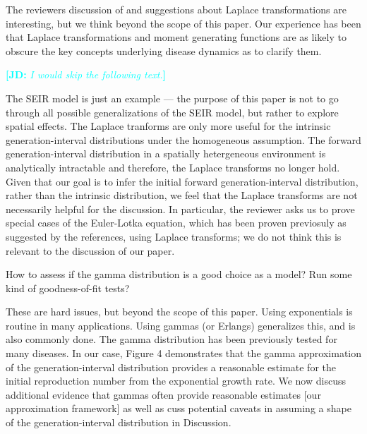 \documentclass[12pt]{article}
\newcommand{\revtext}{\textsf}
\newcommand{\comment}[3]{\textcolor{#1}{\textbf{[#2: }\textsl{#3}\textbf{]}}}
\newcommand{\jd}[1]{\comment{cyan}{JD}{#1}}
\begin{document}
The reviewers discussion of and suggestions about Laplace transformations are interesting, but we think beyond the scope of this paper. Our experience has been that Laplace transformations and moment generating functions are as likely to obscure the key concepts underlying disease dynamics as to clarify them.

\jd{I would skip the following text.}

The SEIR model is just an example --- the purpose of this paper is not to go through all possible generalizations of the SEIR model, but rather to explore spatial effects.
The Laplace tranforms are only more useful for the intrinsic generation-interval distributions under the homogeneous assumption. 
The forward generation-interval distribution in a spatially hetergeneous environment is analytically intractable and therefore, the Laplace transforms no longer hold.
Given that our goal is to infer the initial forward generation-interval distribution, rather than the intrinsic distribution, we feel that the Laplace transforms are not necessarily helpful for the discussion.
In particular, the reviewer asks us to prove special cases of the Euler-Lotka equation, which has been proven previosuly as suggested by the references, using Laplace transforms; 
we do not think this is relevant to the discussion of our paper.

\revtext{How to assess if the gamma distribution is a good choice as a
model? Run some kind of goodness-of-fit tests?}

These are hard issues, but beyond the scope of this paper. Using exponentials is routine in many applications. Using gammas (or Erlangs) generalizes this, and is also commonly done. 
The gamma distribution has been previously tested for many diseases. 
In our case, Figure 4 demonstrates that the gamma approximation of the generation-interval distribution provides a reasonable estimate for the initial reproduction number from the exponential growth rate.
We now discuss additional evidence that gammas often provide reasonable estimates [our approximation framework] as well as cuss potential caveats in assuming a shape of the generation-interval distribution in Discussion.
\end{document}
